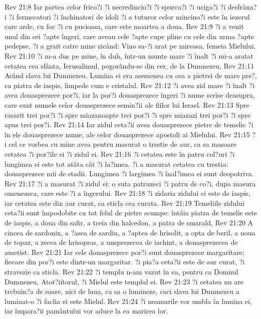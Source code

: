 Rev 21:8  Iar partea celor frico?i ?i necredincio?i ?i spurca?i ?i uciga?i ?i desfrâna?i ?i fermecatori ?i închinatori de idoli ?i a tuturor celor mincino?i este în iezerul care arde, cu foc ?i cu pucioasa, care este moartea a doua.
Rev 21:9  ?i a venit unul din cei ?apte îngeri, care aveau cele ?apte cupe pline cu cele din urma ?apte pedepse, ?i a grait catre mine zicând: Vino sa-?i arat pe mireasa, femeia Mielului.
Rev 21:10  ?i m-a dus pe mine, în duh, într-un munte mare ?i înalt ?i mi-a aratat cetatea cea sfânta, Ierusalimul, pogorându-se din cer, de la Dumnezeu,
Rev 21:11  Având slava lui Dumnezeu. Lumina ei era asemenea cu cea a pietrei de mare pre?, ca piatra de iaspis, limpede cum e cristalul.
Rev 21:12  ?i avea zid mare ?i înalt ?i avea douasprezece por?i, iar la por?i douasprezece îngeri ?i nume scrise deasupra, care sunt numele celor douasprezece semin?ii ale fiilor lui Israel.
Rev 21:13  Spre rasarit trei por?i ?i spre miazanoapte trei por?i ?i spre miazazi trei por?i ?i spre apus trei por?i.
Rev 21:14  Iar zidul ceta?ii avea douasprezece pietre de temelie ?i în ele douasprezece nume, ale celor douasprezece apostoli ai Mielului.
Rev 21:15  ?i cel ce vorbea cu mine avea pentru masurat o trestie de aur, ca sa masoare cetatea ?i por?ile ei ?i zidul ei.
Rev 21:16  ?i cetatea este în patru col?uri ?i lungimea ei este tot atâta cât ?i la?imea. ?i a masurat cetatea cu trestia: douasprezece mii de stadii. Lungimea ?i largimea ?i înal?imea ei sunt deopotriva.
Rev 21:17  ?i a masurat ?i zidul ei: o suta patruzeci ?i patru de co?i, dupa masura omeneasca, care este ?i a îngerului.
Rev 21:18  ?i zidaria zidului ei este de iaspis, iar cetatea este din aur curat, ca sticla cea curata.
Rev 21:19  Temeliile zidului ceta?ii sunt împodobite cu tot felul de pietre scumpe: întâia piatra de temelie este de iaspis, a doua din safir, a treia din halcedon, a patra de smarald,
Rev 21:20  A cincea de sardonix, a ?asea de sardiu, a ?aptea de hrisolit, a opta de beril, a noua de topaz, a zecea de hrisopras, a unsprezecea de iachint, a douasprezecea de ametist.
Rev 21:21  Iar cele douasprezece por?i sunt douasprezece margaritare; fiecare din por?i este dintr-un margaritar. ?i pia?a ceta?ii este de aur curat, ?i stravezie ca sticla.
Rev 21:22  ?i templu n-am vazut în ea, pentru ca Domnul Dumnezeu, Atot?iitorul, ?i Mielul este templul ei.
Rev 21:23  ?i cetatea nu are trebuin?a de soare, nici de luna, ca sa o lumineze, caci slava lui Dumnezeu a luminat-o ?i faclia ei este Mielul.
Rev 21:24  ?i neamurile vor umbla în lumina ei, iar împara?ii pamântului vor aduce la ea marirea lor.
